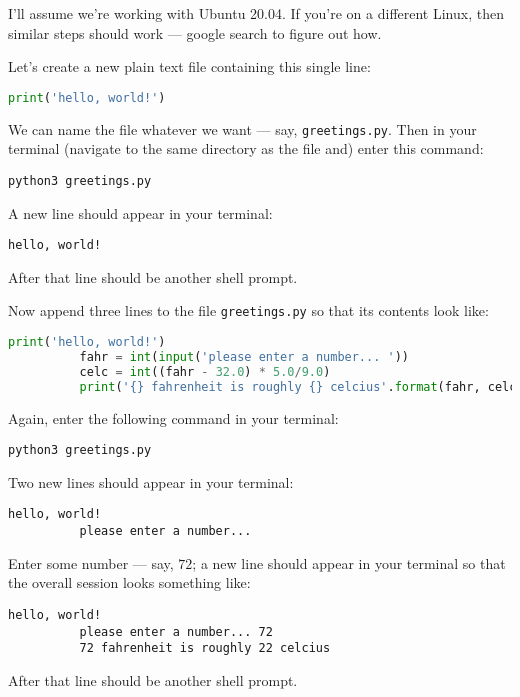 
        I'll assume we're working with Ubuntu 20.04.  If you're on a
        different Linux, then similar steps should work --- google search to
        figure out how.

        Let's create a new plain text file containing this single line:\bcirc{}
        \begin{lstlisting}[language=Python, basicstyle=\footnotesize\ttfamily]
          print('hello, world!')
        \end{lstlisting}
        We can name the file whatever we want --- say, \texttt{greetings.py}.
        Then in your terminal (navigate to the same directory as the file and)
        enter this command:
        \begin{lstlisting}[basicstyle=\footnotesize\ttfamily]
          python3 greetings.py
        \end{lstlisting}
        A new line should appear in your terminal:
        \begin{lstlisting}[basicstyle=\footnotesize\ttfamily]
          hello, world!
        \end{lstlisting}
        After that line should be another shell prompt.

        Now append three lines to the file \texttt{greetings.py} so that its
        contents look like:
        \begin{lstlisting}[language=Python, basicstyle=\footnotesize\ttfamily]
          print('hello, world!')
          fahr = int(input('please enter a number... '))
          celc = int((fahr - 32.0) * 5.0/9.0)
          print('{} fahrenheit is roughly {} celcius'.format(fahr, celc))
        \end{lstlisting}
        Again, enter the following command in your terminal:
        \begin{lstlisting}[basicstyle=\footnotesize\ttfamily]
          python3 greetings.py
        \end{lstlisting}
        Two new lines should appear in your terminal:
        \begin{lstlisting}[basicstyle=\footnotesize\ttfamily]
          hello, world!
          please enter a number...
        \end{lstlisting}
        Enter some number --- say, $72$; a new line should appear in your
        terminal so that the overall session looks something like:
        \begin{lstlisting}[basicstyle=\footnotesize\ttfamily]
          hello, world!
          please enter a number... 72
          72 fahrenheit is roughly 22 celcius
        \end{lstlisting}
        After that line should be another shell prompt.

